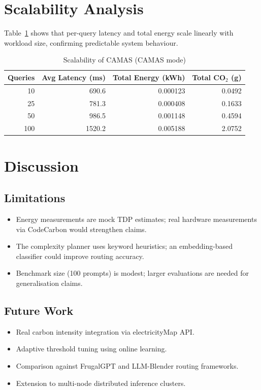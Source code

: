 \documentclass[conference]{IEEEtran}
\begin{document}
\section{Scalability Analysis}

Table~\ref{tab:scale} shows that per-query latency and total energy scale
linearly with workload size, confirming predictable system behaviour.

\begin{table}[h]
\caption{Scalability of CAMAS (CAMAS mode)}
\label{tab:scale}
\centering
\begin{tabular}{rrrr}
\toprule
\textbf{Queries} & \textbf{Avg Latency (ms)} & \textbf{Total Energy (kWh)} & \textbf{Total CO$_2$ (g)} \\
\midrule
 10  & 690.6  & 0.000123 & 0.0492 \\
 25  & 781.3  & 0.000408 & 0.1633 \\
 50  & 986.5  & 0.001148 & 0.4594 \\
100  & 1520.2 & 0.005188 & 2.0752 \\
\bottomrule
\end{tabular}
\end{table}

\section{Discussion}

\subsection{Limitations}
\begin{itemize}
  \item Energy measurements are mock TDP estimates; real hardware measurements
        via CodeCarbon would strengthen claims.
  \item The complexity planner uses keyword heuristics; an embedding-based
        classifier could improve routing accuracy.
  \item Benchmark size (100 prompts) is modest; larger evaluations are needed
        for generalisation claims.
\end{itemize}

\subsection{Future Work}
\begin{itemize}
  \item Real carbon intensity integration via electricityMap API.
  \item Adaptive threshold tuning using online learning.
  \item Comparison against FrugalGPT and LLM-Blender routing frameworks.
  \item Extension to multi-node distributed inference clusters.
\end{itemize}
\end{document}
